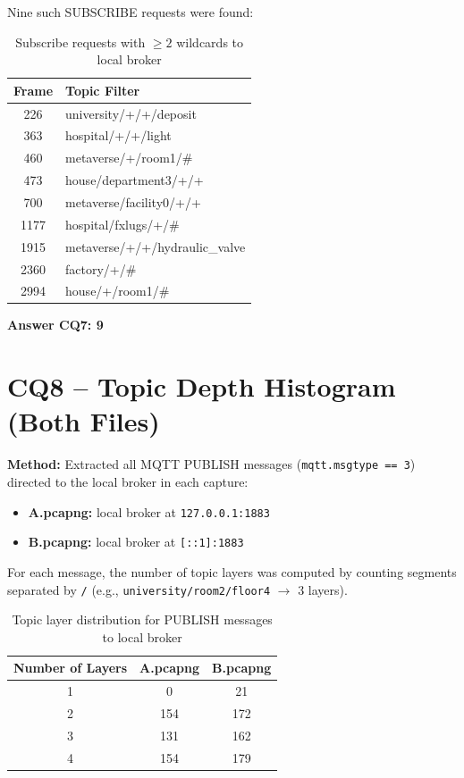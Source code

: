 \documentclass[12pt,a4paper]{article}
\begin{document}
Nine such SUBSCRIBE requests were found:

\begin{table}[H]
\centering
\begin{tabular}{@{}cl@{}}
\toprule
Frame & Topic Filter \\
\midrule
226  & university/+/+/deposit \\
363  & hospital/+/+/light \\
460  & metaverse/+/room1/\# \\
473  & house/department3/+/+ \\
700  & metaverse/facility0/+/+ \\
1177 & hospital/fxlugs/+/\# \\
1915 & metaverse/+/+/hydraulic\_valve \\
2360 & factory/+/\# \\
2994 & house/+/room1/\# \\
\bottomrule
\end{tabular}
\caption{Subscribe requests with $\geq 2$ wildcards to local broker}
\end{table}

\textbf{Answer CQ7: 9}

\section{CQ8 -- Topic Depth Histogram (Both Files)}

\textbf{Method:} Extracted all MQTT PUBLISH messages (\texttt{mqtt.msgtype == 3}) directed to the
local broker in each capture:
\begin{itemize}
    \item \textbf{A.pcapng:} local broker at \texttt{127.0.0.1:1883}
    \item \textbf{B.pcapng:} local broker at \texttt{[::1]:1883}
\end{itemize}

For each message, the number of topic layers was computed by counting segments separated by
\texttt{/} (e.g., \texttt{university/room2/floor4} $\rightarrow$ 3 layers).

\begin{table}[H]
\centering
\begin{tabular}{@{}ccc@{}}
\toprule
Number of Layers & A.pcapng & B.pcapng \\
\midrule
1 & 0   & 21  \\
2 & 154 & 172 \\
3 & 131 & 162 \\
4 & 154 & 179 \\
\bottomrule
\end{tabular}
\caption{Topic layer distribution for PUBLISH messages to local broker}
\end{table}
\end{document}
